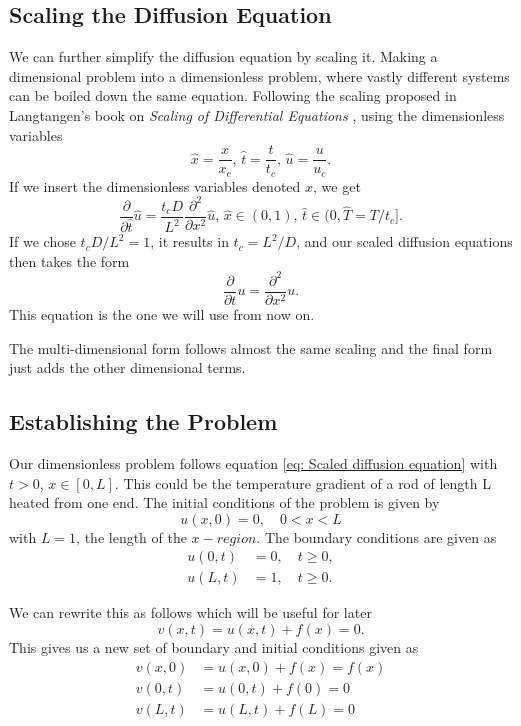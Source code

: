 \documentclass[%
reprint,
nofootinbib,
amsmath,amssymb,
aps,
]{revtex4-1}
\newcommand{\fracpt}{\frac{\partial}{\partial t}}
\newcommand{\fracpxx}{\frac{\partial^2}{\partial x^2}}
\begin{document}
\subsection{Scaling the Diffusion Equation}
We can further simplify the diffusion equation by scaling it. Making a dimensional problem into a dimensionless problem, where vastly different systems can be boiled down the same equation. Following the scaling proposed in Langtangen's book on \textit{Scaling of Differential Equations} \cite{Langtangen2016}, using the dimensionless variables 
\begin{equation}
	\hat{x} = \frac{x}{x_c},\, \hat{t} = \frac{t}{t_c}, \, \hat{u}=\frac{u}{u_c}. 
\end{equation}
If we insert the dimensionless variables denoted $\hat{x}$, we get 
\begin{equation}
	\frac{\partial}{\partial \hat{t}}\hat{u} = \frac{t_cD}{L^2}\frac{\partial^2}{\partial x^2}\hat{u}, \, \hat{x}\in(0,1), \, \hat{t}\in(0,\hat{T} = T/t_c].
\end{equation}
If we chose $t_cD/L^2 = 1$, it results in $t_c = L^2/D$, and our scaled diffusion equations then takes the form 
\begin{equation}\label{eq: Scaled diffusion equation}
	\fracpt u = \fracpxx u.
\end{equation}
This equation is the one we will use from now on. 

The multi-dimensional form follows almost the same scaling and the final form just adds the other dimensional terms. 
\subsection{Establishing the Problem}
Our dimensionless problem follows equation \eqref{eq: Scaled diffusion equation} with $t>0$, $x\in[0,L]$. This could be the temperature gradient of a rod of length L heated from one end. 
The initial conditions of the problem is given by 
\begin{equation}
	u(x,0) = 0, \quad 0 < x < L
\end{equation}
with $L = 1$, the length of the $x-region$. The boundary conditions are given as 
\begin{equation}
	\begin{split}
	u(0,t) &= 0, \quad t\geq 0,\\
	u(L,t) &= 1, \quad t\geq 0.
	\end{split}
\end{equation}

We can rewrite this as follows which will be useful for later
\begin{equation}\label{eq Adapted problem}
	v(x,t) = u(x,t) + f(x) = 0.
\end{equation}
This gives us a new set of boundary and initial conditions given as 
\begin{equation}\label{eq new boundaries}
	\begin{split}
		v(x,0) &= u(x,0) + f(x) = f(x) \\
		v(0,t) &= u(0,t) + f(0) = 0 \\
		v(L,t) &= u(L,t) + f(L) = 0 
	\end{split}
\end{equation}
\end{document}
